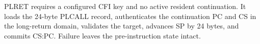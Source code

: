 PLRET requires a configured CFI key and no active resident continuation. It loads the 24-byte PLCALL record, authenticates the continuation PC and CS in the long-return domain, validates the target, advances SP by 24 bytes, and commits CS:PC. Failure leaves the pre-instruction state intact.
